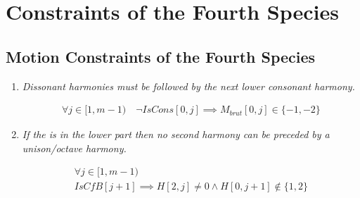 \section*{Constraints of the Fourth Species}

\subsection*{Motion Constraints of the Fourth Species}
\begin{enumerate}[wide, label=\bfseries 4.P\arabic*]
  \item\label{rule:dissolved} {\textit{Dissonant harmonies must be followed by the next lower consonant harmony.}}

\begin{equation}
    \begin{gathered}
        \forall j \in [1, m-1) \quad
        \lnot IsCons[0, j] \implies M_{brut}[0, j] \in \{-1, -2\}
    \end{gathered}
\end{equation}

\item\label{rule:nosecond} {\textit{If the \cfs is in the lower part then no second harmony can be preceded by a unison/octave harmony.}}

\begin{equation}
    \begin{gathered}
        \forall j \in [1, m-1)\\
        IsCfB[j+1] \implies H[2, j] \neq 0 \land H[0, j+1] \notin \{1, 2\}
    \end{gathered}
\end{equation}

\end{enumerate}
